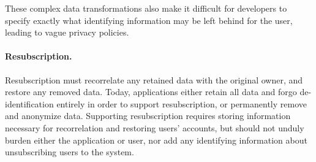 These complex data transformations also make it difficult for developers to specify exactly 
what identifying information may be left behind for the user, leading to vague privacy policies.

\paragraph{Resubscription.}
Resubscription must recorrelate any retained data with the original owner, and restore any removed
data. Today, applications either retain all data and forgo de-identification entirely in order to
support resubscription, or permanently remove and anonymize data.
Supporting resubscription requires storing information necessary for recorrelation and restoring
users' accounts, but should not unduly burden either the application or user, nor add any
identifying information about unsubscribing users to the system.

%


%
%
%
%

